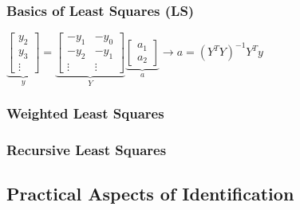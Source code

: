 \subsubsection{Basics of Least Squares (LS)}

$\underbrace{\begin{bmatrix}
	y_2 \\ 
	y_3 \\ 
	\vdots 
\end{bmatrix}}_{y} = 
\underbrace{\begin{bmatrix}
	-y_1 & -y_0 \\ 
	-y_2 & -y_1 \\
	\vdots & \vdots
\end{bmatrix}}_{Y} 
\underbrace{\begin{bmatrix}
	a_1 \\ 
	a_2
\end{bmatrix}}_{a} \longrightarrow a = (Y^TY)^{-1}Y^Ty$

\subsubsection{Weighted Least Squares}

\subsubsection{Recursive Least Squares}

\subsection{Practical Aspects of Identification}